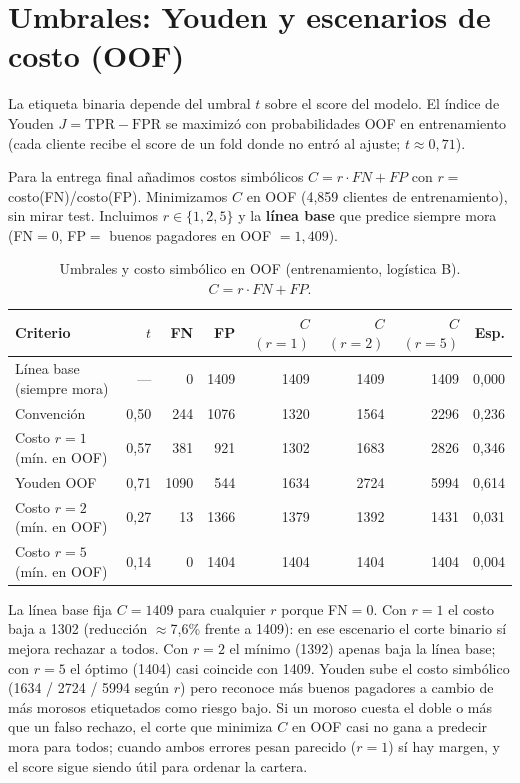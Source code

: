 \documentclass[11pt]{article}
\begin{document}
\section{Umbrales: Youden y escenarios de costo (OOF)}

La etiqueta binaria depende del umbral $t$ sobre el score del modelo. El índice de Youden $J = \mathrm{TPR} - \mathrm{FPR}$ se maximizó con probabilidades OOF en entrenamiento (cada cliente recibe el score de un fold donde no entró al ajuste; $t \approx 0{,}71$).

Para la entrega final añadimos costos simbólicos $C = r \cdot FN + FP$ con $r =$ costo(FN)/costo(FP). Minimizamos $C$ en OOF (4{,}859 clientes de entrenamiento), sin mirar test. Incluimos $r \in \{1, 2, 5\}$ y la \textbf{línea base} que predice siempre mora (FN$=0$, FP$=$ buenos pagadores en OOF $=1{,}409$).

\begin{table}[H]
\centering
\caption{Umbrales y costo simbólico en OOF (entrenamiento, logística B). $C = r\cdot FN + FP$.}
\label{tab:costos_oof}
\footnotesize
\begin{tabular}{@{}lrrrrrrr@{}}
\toprule
\textbf{Criterio} & \textbf{$t$} & \textbf{FN} & \textbf{FP} & \textbf{$C$ $(r{=}1)$} & \textbf{$C$ $(r{=}2)$} & \textbf{$C$ $(r{=}5)$} & \textbf{Esp.} \\
\midrule
Línea base (siempre mora) & --- & 0 & 1409 & 1409 & 1409 & 1409 & 0,000 \\
Convención & 0,50 & 244 & 1076 & 1320 & 1564 & 2296 & 0,236 \\
Costo $r=1$ (mín. en OOF) & 0,57 & 381 & 921 & 1302 & 1683 & 2826 & 0,346 \\
Youden OOF & 0,71 & 1090 & 544 & 1634 & 2724 & 5994 & 0,614 \\
Costo $r=2$ (mín. en OOF) & 0,27 & 13 & 1366 & 1379 & 1392 & 1431 & 0,031 \\
Costo $r=5$ (mín. en OOF) & 0,14 & 0 & 1404 & 1404 & 1404 & 1404 & 0,004 \\
\bottomrule
\end{tabular}
\end{table}

La línea base fija $C = 1409$ para cualquier $r$ porque FN$=0$. Con $r=1$ el costo baja a 1302 (reducción $\approx$7,6\% frente a 1409): en ese escenario el corte binario sí mejora rechazar a todos. Con $r=2$ el mínimo (1392) apenas baja la línea base; con $r=5$ el óptimo (1404) casi coincide con 1409. Youden sube el costo simbólico (1634 / 2724 / 5994 según $r$) pero reconoce más buenos pagadores a cambio de más morosos etiquetados como riesgo bajo. Si un moroso cuesta el doble o más que un falso rechazo, el corte que minimiza $C$ en OOF casi no gana a predecir mora para todos; cuando ambos errores pesan parecido ($r=1$) sí hay margen, y el score sigue siendo útil para ordenar la cartera.
\end{document}
